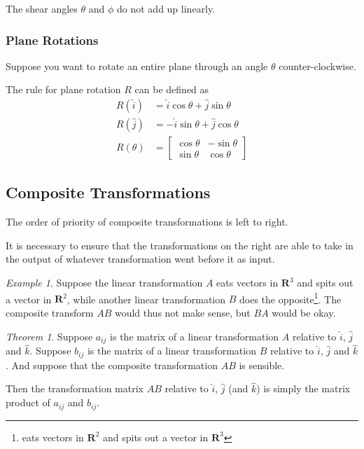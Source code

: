 \documentclass[a4paper]{article}
\theoremstyle{remark}
\newtheorem{example}{Example}
\theoremstyle{theorem}
\newtheorem{theorem}{Theorem}
\begin{document}
The shear angles $\theta$ and $\phi$ do not add up linearly.

\subsubsection{Plane Rotations}
Suppose you want to rotate an entire plane through an angle $\theta$ counter-clockwise.

The rule for plane rotation $R$ can be defined as
\begin{align}
	R(\hat{i})	& = \hat{i}\cos{\theta} + \hat{j}\sin{\theta}\\
	R(\hat{j}) 	& = -\hat{i}\sin{\theta} + \hat{j}\cos{\theta} \\
	R(\theta) 	& = \begin{bmatrix} \cos{\theta} & -\sin{\theta} \\ \sin{\theta} & \cos{\theta} \end{bmatrix}
\end{align}

\subsection{Composite Transformations}
The order of priority of composite transformations is left to right.

It is necessary to ensure that the transformations on the right are able to take in the output of whatever transformation went before it as input.

\begin{example}
	Suppose the linear transformation $A$ eats vectors in $\mathbf{R}^3$ and spits out a vector in $\mathbf{R}^2$, while another linear transformation $B$ does the opposite\footnote{eats vectors in $\mathbf{R}^2$ and spits out a vector in $\mathbf{R}^3$}.
	The composite transform $AB$ would thus not make sense, but $BA$ would be okay.
\end{example}

\begin{theorem}
	Suppose $a_{ij}$ is the matrix of a linear transformation $A$ relative to $\hat{i}$, $\hat{j}$ and $\hat{k}$.
	Suppose $b_{ij}$ is the matrix of a linear transformation $B$ relative to $\hat{i}$, $\hat{j}$ and $\hat{k}$.
	And suppose that the composite transformation $AB$ is sensible.

	Then the transformation matrix $AB$ relative to $\hat{i}$, $\hat{j}$ (and $\hat{k}$) is simply the matrix product of $a_{ij}$ and $b_{ij}$.
\end{theorem}
\end{document}
